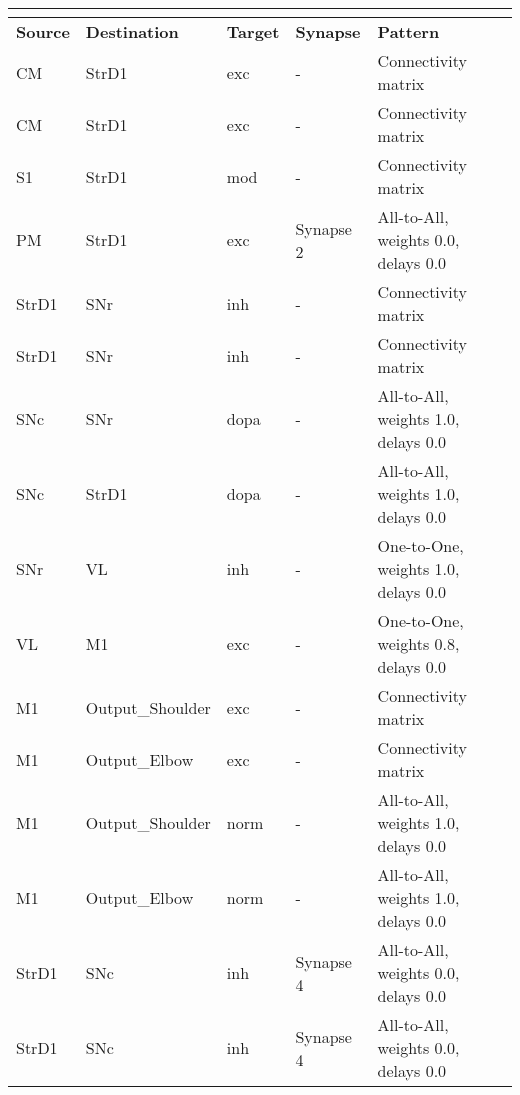 \documentclass{article}
\newcommand{\hdr}[3]{
    \multicolumn{#1}{|l|}{
        \color{white}\cellcolor[gray]{0.0}
        \textbf{\makebox[0pt]{#2}\hspace{0.5\linewidth}\makebox[0pt][c]{#3}}
    }
}
\begin{document}
\vspace{2ex}

\noindent
\begin{tabularx}{\linewidth}{|l|l|l|X|X|}\hline
\hdr{5}{C}{Connectivity}\\ \hline
\textbf{Source} & \textbf{Destination} & \textbf{Target} & \textbf{Synapse} & \textbf{Pattern} \\ \hline

    CM & StrD1 & exc & - &
    Connectivity matrix \\ \hline

    CM & StrD1 & exc & - &
    Connectivity matrix \\ \hline

    S1 & StrD1 & mod & - &
    Connectivity matrix \\ \hline

    PM & StrD1 & exc & Synapse 2 &
    All-to-All, weights 0.0, delays 0.0 \\ \hline

    StrD1 & SNr & inh & - &
    Connectivity matrix \\ \hline

    StrD1 & SNr & inh & - &
    Connectivity matrix \\ \hline

    SNc & SNr & dopa & - &
    All-to-All, weights 1.0, delays 0.0 \\ \hline

    SNc & StrD1 & dopa & - &
    All-to-All, weights 1.0, delays 0.0 \\ \hline

    SNr & VL & inh & - &
    One-to-One, weights 1.0, delays 0.0 \\ \hline

    VL & M1 & exc & - &
    One-to-One, weights 0.8, delays 0.0 \\ \hline

    M1 & Output\_Shoulder & exc & - &
    Connectivity matrix \\ \hline

    M1 & Output\_Elbow & exc & - &
    Connectivity matrix \\ \hline

    M1 & Output\_Shoulder & norm & - &
    All-to-All, weights 1.0, delays 0.0 \\ \hline

    M1 & Output\_Elbow & norm & - &
    All-to-All, weights 1.0, delays 0.0 \\ \hline

    StrD1 & SNc & inh & Synapse 4 &
    All-to-All, weights 0.0, delays 0.0 \\ \hline

    StrD1 & SNc & inh & Synapse 4 &
    All-to-All, weights 0.0, delays 0.0 \\ \hline

\end{tabularx}
\end{document}
